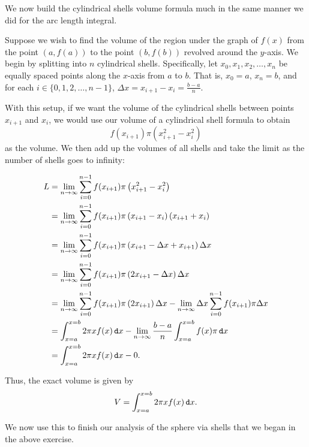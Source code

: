 We now build the cylindrical shells volume formula much in the same manner we did for the arc length integral. 

Suppose we wish to find the volume of the region under the graph of $f(x)$ from the point $\left(a,f(a)\right)$ to the point $\left(b,f(b)\right)$ revolved around the $y$-axis.  We begin by splitting into $n$ cylindrical shells.  Specifically, let $x_0,x_1,x_2,\ldots,x_n$ be equally spaced points along the $x$-axis from $a$ to $b$.  That is, $x_0=a$, $x_n=b$, and for each $i\in\lbrace 0,1,2,\ldots , n-1 \rbrace$, $\Delta x = x_{i+1}-x_{i}=\frac{b-a}{n}$.

With this setup, if we want the volume of the cylindrical shells between points $x_{i+1}$ and $x_{i}$, we would use our volume of a cylindrical shell formula to obtain 
$$f(x_{i+1})\pi\left(x_{i+1}^2-x_{i}^2 \right) $$ as the volume.  We then add up the volumes of all shells and take the limit as the number of shells goes to infinity:

\begin{align*}
L&=\lim_{n\rightarrow \infty}\sum_{i=0}^{n-1} f(x_{i+1})\pi\left(x_{i+1}^2-x_{i}^2 \right)  \\
&=\lim_{n\rightarrow \infty}\sum_{i=0}^{n-1} f(x_{i+1})\pi\left(x_{i+1}-x_{i} \right)\left(x_{i+1}+x_{i} \right) \\
&=\lim_{n\rightarrow \infty}\sum_{i=0}^{n-1} f(x_{i+1})\pi\left(x_{i+1}-\Delta x +x_{i+1} \right) \Delta x \\
&=\lim_{n\rightarrow \infty}\sum_{i=0}^{n-1} f(x_{i+1})\pi\left(2x_{i+1}-\Delta x \right) \Delta x \\
&=\lim_{n\rightarrow \infty}\sum_{i=0}^{n-1} f(x_{i+1})\pi\left(2x_{i+1}\right) \Delta x-\lim_{n\rightarrow \infty}\Delta x \sum_{i=0}^{n-1} f(x_{i+1})\pi \Delta x \\
&=\int_{x=a}^{x=b} 2 \pi x f(x) \mathop{}\!\mathtt{d} x-\lim_{n\rightarrow \infty}\frac{b-a}{n} \int_{x=a}^{x=b} f(x)\pi \mathop{}\!\mathtt{d} x \\
&=\int_{x=a}^{x=b} 2 \pi x f(x) \mathop{}\!\mathtt{d} x-0. \\
\end{align*}

 Thus, the exact volume is given by $$ V= \int_{x=a}^{x=b} 2 \pi x f(x) \mathop{}\!\mathtt{d} x. $$

We now use this to finish our analysis of the sphere via shells that we began in the above exercise.

